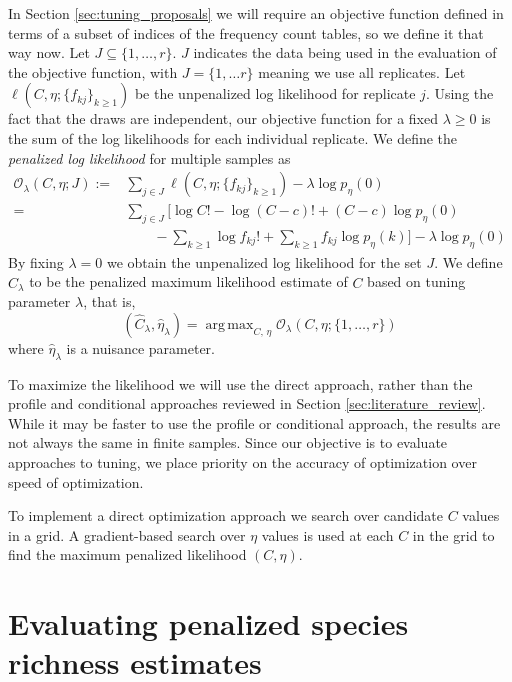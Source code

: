 \documentclass[12pt]{article}
\DeclareMathOperator*{\argmax}{arg\,max}
\theoremstyle{break}
\theoremstyle{break}
\begin{document}
In Section \ref{sec:tuning_proposals} we will require an objective function defined in terms of a subset of indices of the frequency count tables, so we define it that way now.  Let $J \subseteq \{1, \dots, r\}$.  $J$ indicates the data being used in the evaluation of the objective function, with $J = \{1, \dots r\}$ meaning we use all replicates.  Let $\ell \left(C, \eta; \{f_{kj}\}_{k \geq 1} \right)$ be the unpenalized log likelihood for replicate $j$.
Using the fact that the draws are independent, our objective function for a fixed $\lambda \geq 0$ is the sum of the log likelihoods for each individual replicate.
We define the \textit{penalized log likelihood} for multiple samples as
\begin{align}
\mathcal{O}_{\lambda}(C, \eta; J) :=& \sum_{j \in J} \ell \left(C, \eta; \{f_{kj}\}_{k \geq 1} \right) - \lambda\log p_{\eta}(0) \\
 =& \sum_{j \in J} \biggl[ \log C! - \log (C-c)! + (C-c) \log p_\eta(0)  \nonumber \\
 & \qquad  - \sum_{k \geq 1} \log{} f_{kj}! + \sum_{k \geq 1} f_{kj} \log p_\eta(k) \biggr] - \lambda \log p_\eta(0)    \label{eq:objective}
\end{align}
By fixing $\lambda = 0$ we obtain the unpenalized log likelihood for the set $J$.  We define $\widehat{C}_{\lambda}$ to be the penalized maximum likelihood estimate of $C$ based on tuning parameter $\lambda$, that is,
\begin{equation}
\left(\widehat{C}_{\lambda},  \widehat{\eta}_{\lambda} \right) = \argmax_{C, \, \eta}  \mathcal{O}_{\lambda} \left(C, \eta ; \{1, \dots , r\} \right) \label{eq:ccc_hat_lambda}
\end{equation}
where $\widehat{\eta}_{\lambda}$ is a nuisance parameter.

To maximize the likelihood we will use the direct approach, rather than the profile and conditional approaches reviewed in Section \ref{sec:literature_review}.  While it may be faster to use the profile or conditional approach, the results are not always the same in finite samples.
Since our objective is to evaluate approaches to tuning, we place priority on the accuracy of optimization over speed of optimization.

To implement a direct optimization approach we search over candidate $C$ values in a grid.  A gradient-based search over $\eta$ values is used at each $C$ in the grid to find the maximum penalized likelihood  $(C, \eta)$.

\section{Evaluating penalized species richness estimates}
\label{sec:efficacy_sims}
\end{document}
